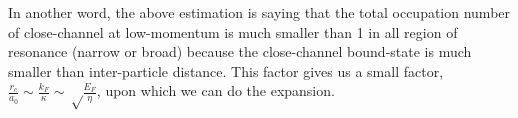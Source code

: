  



 In another word, the above estimation is saying that the total occupation number of close-channel at low-momentum is much smaller than 1 in all region of resonance (narrow or broad) because the close-channel bound-state is much smaller than inter-particle distance.  This factor gives us a small factor, $\frac{r_{c}}{a_{0}}\sim\frac{k_{F}}{\kappa}\sim\sqrt\frac{E_{F}}{\eta}$, upon which we can do the expansion.  
